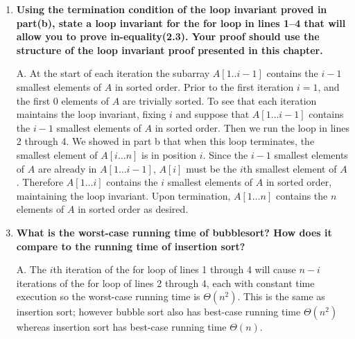 \documentclass[fontsize=12pt,paper=a4,open=any]{book}
\begin{document}
\begin{enumerate}
\begin{enumerate}
		\item \textbf{Using the termination condition of the loop invariant proved in part(b), state a loop invariant for the for loop in lines 1–4 that will allow you to prove in-equality(2.3). Your proof should use the structure of the loop invariant proof
presented in this chapter.}
		\item[A.]
		At the start of each iteration the subarray $A[1..i-1]$ contains the $i-1$ smallest elements of $A$ in sorted order. Prior to the first iteration $i = 1$, and the first 0 elements of $A$ are trivially sorted. To see that each iteration maintains the loop invariant, fixing $i$ and suppose that $A[1 \dots i - 1]$ contains the $i - 1$ smallest elements of $A$ in sorted order. Then we run the loop in lines 2 through 4. We showed in part b that when this loop terminates, the smallest element of $A[i \dots n]$ is in position $i$. Since the $i-1$ smallest elements of $A$ are already in $A[1 \dots i - 1]$, $A[i]$ must be the $i$th smallest element of $A$. Therefore $A[1 \dots i]$ contains the $i$ smallest elements of $A$ in sorted order, maintaining the loop invariant. Upon termination, $A[1 \dots n]$ contains the $n$ elements of $A$ in sorted order as desired.

		\item \textbf{What is the worst-case running time of bubblesort? How does it compare to the running time of insertion sort?}
		\item[A.]
		The $i$th iteration of the for loop of lines 1 through 4 will cause $n-i$ iterations of the for loop of lines 2 through 4, each with constant time execution so the worst-case running time is $\Theta(n^2)$. 
This is the same as insertion sort; however bubble sort also has best-case running time $\Theta(n^2)$ whereas insertion sort has best-case running time $\Theta(n)$.		
	\end{enumerate}
	

\end{enumerate}
\end{document}
